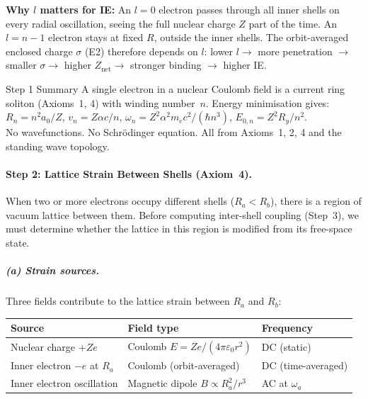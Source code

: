 \noindent\textbf{Why $l$ matters for IE:}
An $l = 0$ electron passes through all inner
shells on every radial oscillation, seeing the
full nuclear charge $Z$ part of the time.
An $l = n{-}1$ electron stays at fixed $R$,
outside the inner shells.  The orbit-averaged
enclosed charge $\sigma$ (E2) therefore depends
on $l$: lower $l \to$ more penetration $\to$
smaller $\sigma \to$ higher $Z_{\text{net}} \to$
stronger binding $\to$ higher IE.

\begin{resultbox}{Step 1 Summary}
A single electron in a nuclear Coulomb field is a
current ring soliton (Axioms~1, 4) with winding
number~$n$.  Energy minimisation gives:\\
$R_n = n^2 a_0 / Z$, \quad
$v_n = Z\alpha c / n$, \quad
$\omega_n = Z^2 \alpha^2 m_e c^2 / (\hbar n^3)$, \quad
$E_{0,n} = Z^2 R_y / n^2$.\\
No wavefunctions.  No Schr\"odinger equation.
All from Axioms~1, 2, 4 and the standing wave topology.
\end{resultbox}

\paragraph{Step 2: Lattice Strain Between Shells (Axiom~4).}

When two or more electrons occupy different shells ($R_a < R_b$),
there is a region of vacuum lattice between them.  Before computing
inter-shell coupling (Step~3), we must determine whether the
lattice in this region is modified from its free-space state.

\subparagraph{(a) Strain sources.}
Three fields contribute to the lattice strain between
$R_a$ and $R_b$:
\begin{center}
\small
\begin{tabular}{lll}
\hline
\textbf{Source} & \textbf{Field type} & \textbf{Frequency} \\
\hline
Nuclear charge $+Ze$ & Coulomb $E = Ze/(4\pi\varepsilon_0 r^2)$
    & DC (static) \\
Inner electron $-e$ at $R_a$ & Coulomb (orbit-averaged)
    & DC (time-averaged) \\
Inner electron oscillation & Magnetic dipole $B \propto R_a^2/r^3$
    & AC at $\omega_a$ \\
\hline
\end{tabular}
\end{center}

